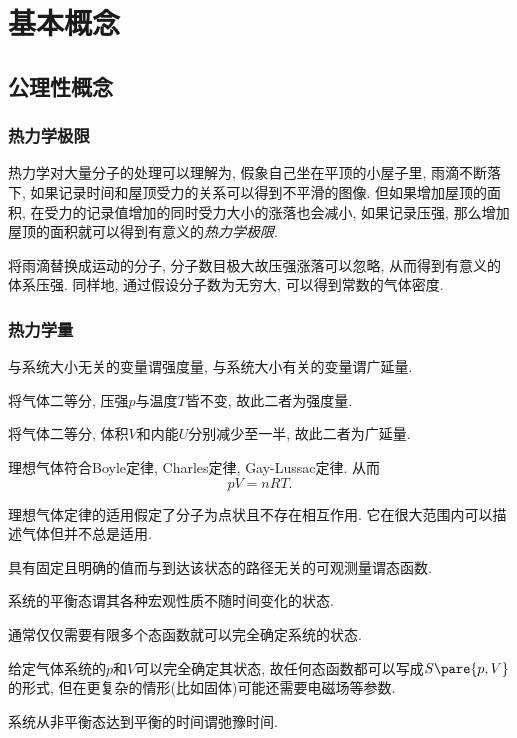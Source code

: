 \documentclass[../Thermal.tex]{subfiles}
\begin{document}
\section{基本概念}
\subsection{公理性概念}
\subsubsection{热力学极限}
热力学对大量分子的处理可以理解为, 假象自己坐在平顶的小屋子里, 雨滴不断落下, 如果记录时间和屋顶受力的关系可以得到不平滑的图像. 但如果增加屋顶的面积, 在受力的记录值增加的同时受力大小的涨落也会减小, 如果记录压强, 那么增加屋顶的面积就可以得到有意义的\emph{热力学极限}.
\par
将雨滴替换成运动的分子, 分子数目极大故压强涨落可以忽略, 从而得到有意义的体系压强. 同样地, 通过假设分子数为无穷大, 可以得到常数的气体密度.
\subsubsection{热力学量}
\begin{definition}[强度量与广延量]
与系统大小无关的变量谓强度量, 与系统大小有关的变量谓广延量.
\end{definition}
\begin{ex}
将气体二等分, 压强$p$与温度$T$皆不变, 故此二者为强度量.
\end{ex}
\begin{ex}
将气体二等分, 体积$V$和内能$U$分别减少至一半, 故此二者为广延量.
\end{ex}
\begin{finale}
\begin{axiom}[理想气体定律]
理想气体符合Boyle定律, Charles定律, Gay-Lussac定律. 从而
\[ pV = nRT. \]
\end{axiom}
\end{finale}
理想气体定律的适用假定了分子为点状且不存在相互作用. 它在很大范围内可以描述气体但并不总是适用.
\begin{definition}[态函数]
具有固定且明确的值而与到达该状态的路径无关的可观测量谓态函数.
\end{definition}
\begin{definition}[平衡态]
系统的平衡态谓其各种宏观性质不随时间变化的状态.
\end{definition}
通常仅仅需要有限多个态函数就可以完全确定系统的状态.
\begin{ex}
给定气体系统的$p$和$V$可以完全确定其状态, 故任何态函数都可以写成$S\pare{p,V}$的形式, 但在更复杂的情形(比如固体)可能还需要电磁场等参数.
\end{ex}
\begin{definition}[弛豫时间]
系统从非平衡态达到平衡的时间谓弛豫时间.
\end{definition}
\end{document}
